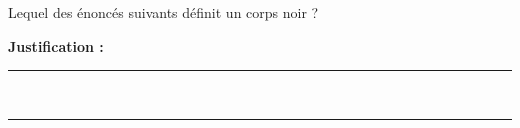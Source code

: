 Lequel des énoncés suivants définit un corps noir ?

\choices

\noindent\textbf{Justification :} \hrulefill \\[2.5ex]
\rule{\linewidth}{0.4pt} \\[2.5ex]
\rule{\linewidth}{0.4pt}
\vfill
